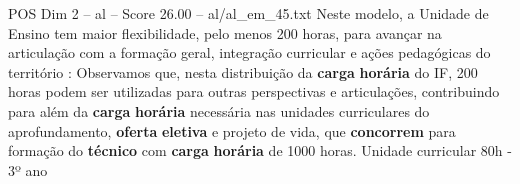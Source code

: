 \begin{textsample}{POS Dim 2 – al – Score 26.00 – al/al\_em\_45.txt}
Neste modelo, a Unidade de Ensino tem maior flexibilidade, pelo menos 200 horas, para avançar na articulação com a formação geral, integração curricular e ações pedagógicas do território : Observamos que, nesta distribuição da \textbf{carga} \textbf{horária} do IF, 200 horas podem ser utilizadas para outras perspectivas e articulações, contribuindo para além da \textbf{carga} \textbf{horária} necessária nas unidades curriculares do aprofundamento, \textbf{oferta} \textbf{eletiva} e projeto de vida, que \textbf{concorrem} para formação do \textbf{técnico} com \textbf{carga} \textbf{horária} de 1000 horas.
Unidade curricular 80h - 3º ano

\end{textsample}
